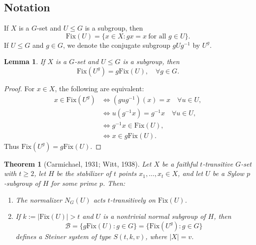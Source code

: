 \documentclass[12pt,a4paper,openany]{book}
\newtheorem{theorem}{Theorem}[section]
\newtheorem{lemma}{Lemma}[section]
\newcommand{\Fix}{\mathrm{Fix}}
\begin{document}
\subsection*{Notation}
If $X$ is a $G$-set and $U \leq G$ is a subgroup, then
\[
\Fix(U) = \{x \in X : gx = x \ \text{for all } g \in U\}.
\]
If $U \leq G$ and $g \in G$, we denote the conjugate subgroup $gUg^{-1}$ by $U^g$.

\begin{lemma}\label{lem:fix-conjugate}
If $X$ is a $G$-set and $U \leq G$ is a subgroup, then
\[
\Fix(U^g) = g \Fix(U), \quad \forall g \in G.
\]
\end{lemma}

\begin{proof}
For $x \in X$, the following are equivalent:
\begin{align*}
x \in \Fix(U^g) 
&\iff (gug^{-1})(x) = x \quad \forall u \in U, \\
&\iff u(g^{-1}x) = g^{-1}x \quad \forall u \in U, \\
&\iff g^{-1}x \in \Fix(U), \\
&\iff x \in g\Fix(U).
\end{align*}
Thus $\Fix(U^g) = g\Fix(U)$.
\end{proof}


\begin{theorem}[Carmichael, 1931; Witt, 1938]\label{thm:carmichael-witt}
Let $X$ be a faithful $t$-transitive $G$-set with $t \ge 2$, let $H$ be the stabilizer of $t$ points $x_1, \dots, x_t \in X$, and let $U$ be a Sylow $p$-subgroup of $H$ for some prime $p$. Then:
\begin{enumerate}[label=(\roman*)]
    \item The normalizer $N_G(U)$ acts $t$-transitively on $\Fix(U)$.
    \item If $k := |\Fix(U)| > t$ and $U$ is a nontrivial normal subgroup of $H$, then
    \[
    \mathscr{B} = \{g \Fix(U) : g \in G\} = \{\Fix(U^g) : g \in G\}
    \]
    defines a Steiner system of type $S(t, k, v)$, where $|X| = v$.
\end{enumerate}
\end{theorem}
\end{document}
